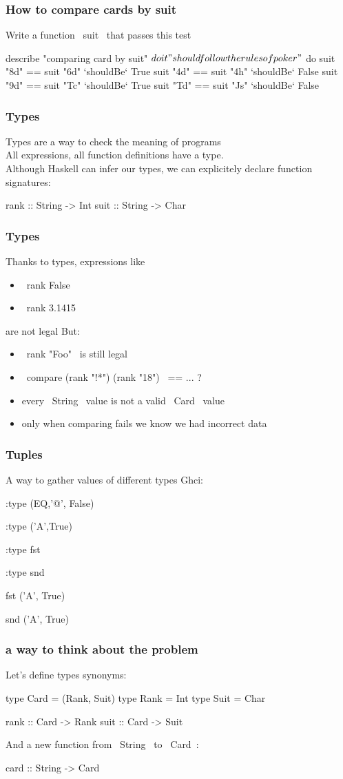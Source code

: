 \documentclass[12pt,xcolor={dvipsnames}]{beamer}
\newcommand{\tc}{\textcolor}
\newcommand{\key}[1]{\tc{orange}{#1}}
\newcommand{\rk}{\enskip{\key{$\hookleftarrow$}}}
\newcommand{\vs}{\vspace{1em}}
\begin{document}
\begin{frame}[fragile]
\frametitle{How to compare cards by suit}
Write a function ~suit~ that passes this test
\vs
\begin{hspec}
describe "comparing card by suit" $ do
    it "should follow the rules of poker" $ do
        suit "8d" == suit "6d" `shouldBe` True
        suit "4d" == suit "4h" `shouldBe` False
        suit "9d" == suit "Tc" `shouldBe` True
        suit "Td" == suit "Js" `shouldBe` False
\end{hspec}
\end{frame}
\begin{frame}[fragile]
\frametitle{Types}
Types are a way to check the meaning of programs\\
All expressions, all function definitions have a type.\\
Although Haskell can infer our types, we can explicitely declare function signatures:
\vs
\begin{haskell}
rank :: String -> Int
suit :: String -> Char
\end{haskell}
\end{frame}
\begin{frame}[fragile]
\frametitle{Types}
Thanks to types, expressions like
\begin{itemize}
\item  ~rank False~ 
\item  ~rank 3.1415~ 
\end{itemize}
are not legal
\vs
But:
\begin{itemize}
\item  ~rank "Foo"~ is still legal
\item  ~compare (rank "!*") (rank "18")~ == ... ?
\item  every ~String~ value is not a valid ~Card~ value
\item  only when comparing fails we know we had incorrect data
\end{itemize}
\end{frame}
\begin{frame}[fragile]
\frametitle{Tuples}
A way to gather values of different types
\vs
Ghci:
\begin{term}
:type (EQ,'@', False)\rk

:type ('A',True)\rk

:type fst\rk

:type snd\rk

fst ('A', True)\rk

snd ('A', True) \rk
\end{term}
\end{frame}
\begin{frame}[fragile]
\frametitle{a way to think about the problem}
Let's define types synonyms:
\begin{haskell}
type Card = (Rank, Suit) 
type Rank = Int
type Suit = Char

rank :: Card -> Rank
suit :: Card -> Suit
\end{haskell}
And a new function from ~String~ to ~Card~:
\begin{haskell}
card :: String -> Card
\end{haskell}

\end{frame}
\end{document}
